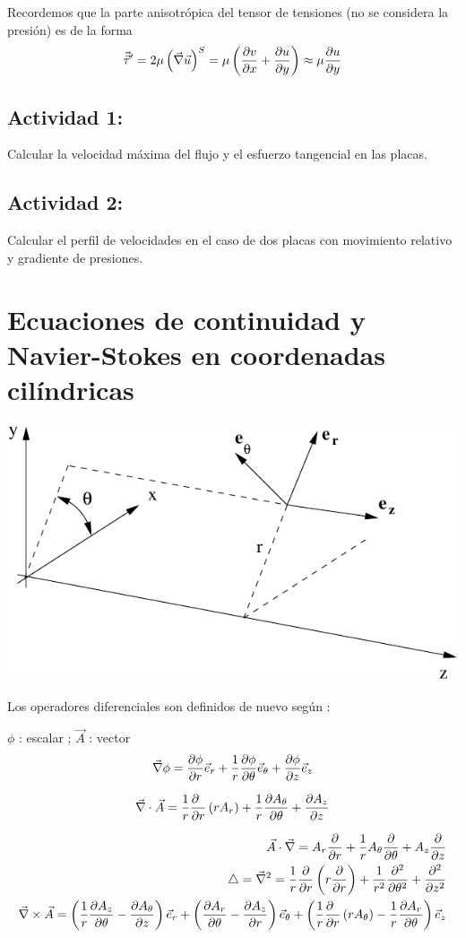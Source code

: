 Recordemos que la parte anisotrópica del tensor de tensiones (no se
considera la presión) es de la forma
\[
\vec{\vec{\tau}}^{\prime}=2\mu\left(\vec{\nabla}\text{\ensuremath{\vec{u}}}\right)^{S}=\mu\left(\frac{\partial v}{\partial x}+\frac{\partial u}{\partial y}\right)\approx\mu\frac{\partial u}{\partial y}
\]

\subsection*{Actividad 1:}
Calcular la velocidad máxima del flujo y el esfuerzo tangencial en las placas.


\subsection*{Actividad 2:}
Calcular el perfil de velocidades en el caso de dos placas con movimiento
relativo y gradiente de presiones.
	
\section{Ecuaciones de continuidad y Navier-Stokes en coordenadas cilíndricas}

\begin{center}
	\includegraphics[width=0.5\linewidth]{TeX_files/chapter05-FlujoViscoco/Figures/cilindricas.pdf}
\end{center}

	
	Los operadores diferenciales son definidos de nuevo según :
	
	$\phi$ : escalar ; $\vec{A}$ : vector 
		\[
		\vec{\nabla}\phi=\frac{\partial \phi}{\partial r}\vec{e}_{r}+\frac{1}{r}\frac{\partial \phi}{\partial \theta}\vec{e}_{\theta}+\frac{\partial \phi}{\partial z}\vec{e}_{z}
		\]
		
		\[
		\vec{\nabla}\cdot\vec{A}=\frac{1}{r}\frac{\partial \phantom{r}}{\partial r}\left(rA_{r}\right)+\frac{1}{r}\frac{\partial A_{\theta}}{\partial \theta}+\frac{\partial A_{z}}{\partial z}
		\]
	
		\[
		\begin{aligned}\vec{A}\cdot\vec{\nabla}=A_{r}\frac{\partial }{\partial r}+\frac{1}{r}A_{\theta}\frac{\partial }{\partial \theta}+A_{z}\frac{\partial }{\partial z}\\
			\triangle=\vec{\nabla}^{2}=\frac{1}{r}\frac{\partial }{\partial r}\left(r\frac{\partial }{\partial r}\right)+\frac{1}{r^{2}}\frac{\partial^2 }{\partial \theta^2}+\frac{\partial^2 }{\partial z^2}\\
			\begin{split}\vec{\nabla}\times\vec{A}=\left(\frac{1}{r}\frac{\partial A_{z}}{\partial \theta}-\frac{\partial A_{\theta}}{\partial z}\right)\vec{e}_{r}+\left(\frac{\partial A_{r}}{\partial \theta}-\frac{\partial A_{z}}{\partial r}\right)\vec{e}_{\theta}+\left(\frac{1}{r}\frac{\partial \phantom{r}}{\partial r}\left(rA_{\theta}\right)-\frac{1}{r}\frac{\partial A_{r}}{\partial \theta}\right)\vec{e}_{z}\end{split}
		\end{aligned}
		\]
	

